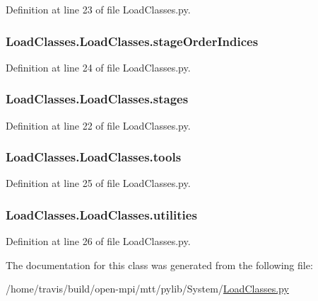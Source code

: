 Definition at line 23 of file Load\-Classes.\-py.

\hypertarget{class_load_classes_1_1_load_classes_adb9a18af5fe6814c0c46e8c51f9682ef}{
\subsubsection[{stage\-Order\-Indices}]{\setlength{\rightskip}{0pt plus 5cm}Load\-Classes.\-Load\-Classes.\-stage\-Order\-Indices}}\label{class_load_classes_1_1_load_classes_adb9a18af5fe6814c0c46e8c51f9682ef}


Definition at line 24 of file Load\-Classes.\-py.

\hypertarget{class_load_classes_1_1_load_classes_aca4663cc6002ec1139e8b07f15aa1006}{
\subsubsection[{stages}]{\setlength{\rightskip}{0pt plus 5cm}Load\-Classes.\-Load\-Classes.\-stages}}\label{class_load_classes_1_1_load_classes_aca4663cc6002ec1139e8b07f15aa1006}


Definition at line 22 of file Load\-Classes.\-py.

\hypertarget{class_load_classes_1_1_load_classes_acea1357ee5b059c0c010c62d9dcdfd42}{
\subsubsection[{tools}]{\setlength{\rightskip}{0pt plus 5cm}Load\-Classes.\-Load\-Classes.\-tools}}\label{class_load_classes_1_1_load_classes_acea1357ee5b059c0c010c62d9dcdfd42}


Definition at line 25 of file Load\-Classes.\-py.

\hypertarget{class_load_classes_1_1_load_classes_a9bc5a2e86aee8dffd444ea68bc9258de}{
\subsubsection[{utilities}]{\setlength{\rightskip}{0pt plus 5cm}Load\-Classes.\-Load\-Classes.\-utilities}}\label{class_load_classes_1_1_load_classes_a9bc5a2e86aee8dffd444ea68bc9258de}


Definition at line 26 of file Load\-Classes.\-py.



The documentation for this class was generated from the following file\-:\begin{DoxyCompactItemize}
\item 
/home/travis/build/open-\/mpi/mtt/pylib/\-System/\hyperlink{_load_classes_8py}{Load\-Classes.\-py}\end{DoxyCompactItemize}
